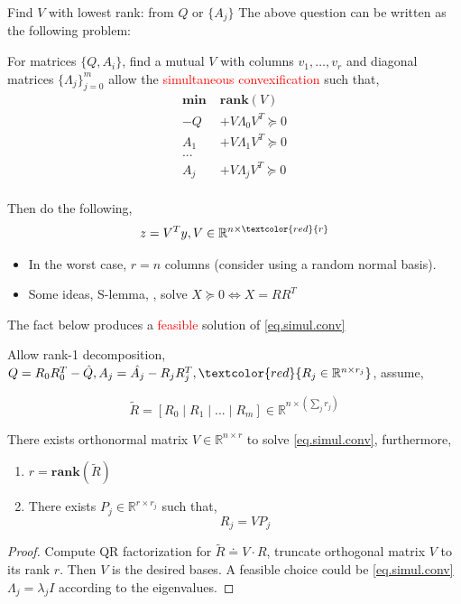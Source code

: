 \documentclass[aspectratio=1610, 9pt]{beamer}
\newcommand{\rank}{\textbf{rank}}
\newcommand{\mn}{\mathbf{\min}\;}
\newcommand{\red}[1]{\textcolor{red}{#1}}
\newcommand{\redsf}[1]{\textcolor{red}{\textsf{#1}}}
\newcommand{\real}{\mathbb{R}}
\begin{document}
\begin{frame}[allowframebreaks]{Find \(V\) with lowest rank: from \(Q\) or \(\{A_j\}\)}
  The above question can be written as the following problem:

  For matrices \(\{Q, A_i\}\), find a mutual \(V\) with columns \(v_1, \dots, v_r\) and diagonal matrices \(\{\Lambda_j\}_{j=0}^m\) allow the \red{simultaneous convexification} such that,
  \begin{equation}\label{eq.simul.conv}
    \begin{aligned}
      \mn & \rank\left(V\right)         \\
      - Q & +  V\Lambda_0 V^T \succeq 0 \\
      A_1 & +  V\Lambda_1 V^T \succeq 0 \\
      ...                               \\
      A_j & +  V\Lambda_j V^T \succeq 0 \\
    \end{aligned}
  \end{equation}

  Then do the following,
  \begin{align*}
    z = V^T y , V\in \real^{n \times \red{r}}
  \end{align*}

  \begin{itemize}
    \item In the worst case, \(r=n\) columns (consider using a random normal basis).
    \item Some ideas, S-lemma, \cite{burer_nonlinear_2003}, solve \(X\succeq 0 \Leftrightarrow X= RR^T \)
  \end{itemize}

  \framebreak
  The fact below produces a \redsf{feasible} solution of \eqref{eq.simul.conv}
  \begin{theorem}
    \label{pp.simul.conv.cond1}
    Allow rank-1 decomposition, \(Q = R_0 R_0^T - \hat{Q} , A_j = \hat{A_j}- R_j R_j^T, \red{R_j\in \real^{n\times r_j}}\), assume,

    \[\tilde R = \left [R_0 \mid R_1 \mid ... \mid R_m \right ]   \in \real^{n \times (\sum_j r_j)}\]

    There exists orthonormal matrix \(V \in \real^{n\times r}\) to solve \eqref{eq.simul.conv}, furthermore,

    \begin{enumerate}
      \item \(r= \rank (\tilde{R})\)
      \item There exists \(P_j \in \real^{r\times r_j}\) such that,
            \[ R_j = V P_j\]
    \end{enumerate}
  \end{theorem}

  \begin{proof}
    Compute QR factorization for \(\tilde R \doteq V\cdot R\), truncate orthogonal matrix \(V\) to its rank \(r\). Then \(V\) is the desired bases.
    A feasible choice could be \eqref{eq.simul.conv} \(\Lambda_j = \lambda_j I\) according to the eigenvalues.
  \end{proof}

\end{frame}
\end{document}
